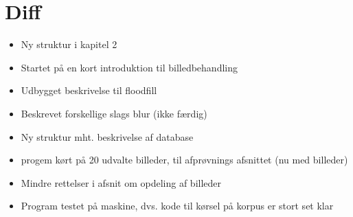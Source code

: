 {
\section*{Diff}
\begin{itemize}
    \item Ny struktur i kapitel 2
    \item Startet på en kort introduktion til billedbehandling
    \item Udbygget beskrivelse til floodfill
    \item Beskrevet forskellige slags blur (ikke færdig)
    \item Ny struktur mht. beskrivelse af database
    \item progem kørt på 20 udvalte billeder, til afprøvnings afsnittet
        (nu med billeder)
    \item Mindre rettelser i afsnit om opdeling af billeder
    \item Program testet på maskine, dvs. kode til kørsel på korpus er
        stort set klar
\end{itemize}
}

